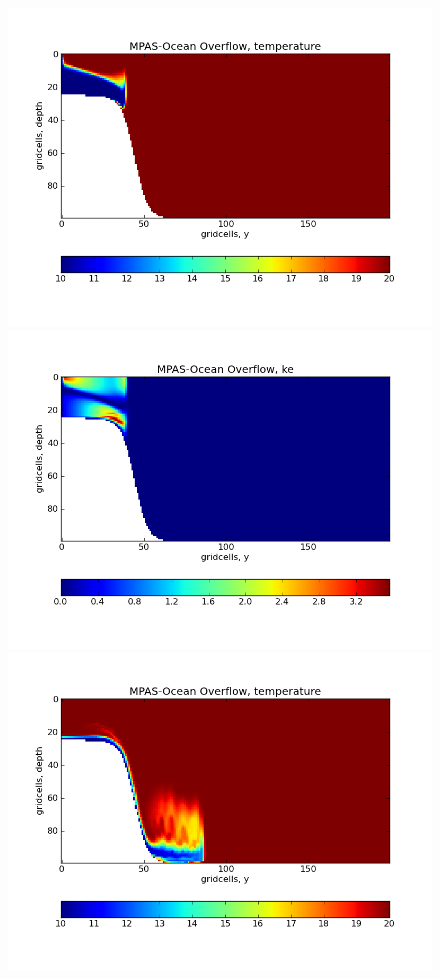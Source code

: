 \begin{figure}[H]
	\includegraphics[scale=0.4]{ocean/figures/MPAS-O_overflow_temperature_3hrs.png}
	\includegraphics[scale=0.4]{ocean/figures/MPAS-O_overflow_ke_3hrs.png}\\
	\includegraphics[scale=0.4]{ocean/figures/MPAS-O_overflow_temperature_9hrs.png}

\end{figure}
